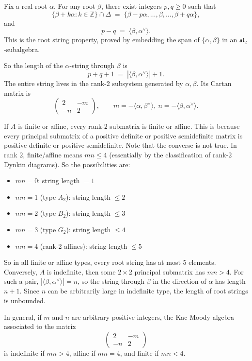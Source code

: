 \documentclass[12pt]{article}
\begin{document}
\begin{solution}
    Fix a real root $\alpha$. For any root $\beta$, there exist integers $p,q\geq 0$ such that
\[
\{\beta+k\alpha : k\in\mathbb Z\}\cap \Delta \;=\; \{\beta-p\alpha, \dots, \beta, \dots, \beta+q\alpha\},
\]
and
\[
p-q \;=\;\langle \beta, \alpha^\vee\rangle.
\]
This is the root string property, proved by embedding the span of $\{\alpha,\beta\}$ in an $\mathfrak{sl}_2$-subalgebra.

So the length of the $\alpha$-string through $\beta$ is
\[
p+q+1 \;=\; |\langle \beta, \alpha^\vee\rangle|+1. 
\]
The entire string lives in the rank-2 subsystem generated by $\alpha,\beta$. Its Cartan matrix is
\[
\begin{pmatrix}
2 & -m \\ -n & 2
\end{pmatrix},\qquad
m=-\langle \alpha,\beta^\vee\rangle,\ n=-\langle \beta,\alpha^\vee\rangle.
\]

If $A$ is finite or affine, every rank-2 submatrix is finite or affine. This is because every principal submatrix of a positive definite or positive semidefinite matrix is positive definite or positive semidefinite. Note that the converse is not true. In rank 2, finite/affine means $mn \leq 4$ (essentially by the classification of rank-2 Dynkin diagrams). So the possibilities are:
\begin{itemize}
    \item $mn=0$: string length $=1$
    \item $mn=1$ (type $A_2$): string length $\leq 2$
    \item $mn=2$ (type $B_2$): string length $\leq 3$
    \item $mn=3$ (type $G_2$): string length $\leq 4$
    \item $mn=4$ (rank-2 affines): string length $\leq 5$
\end{itemize}
So in all finite or affine types, every root string has at most 5 elements. Conversely, $A$ is indefinite, then some $2\times2$ principal submatrix has $mn>4$. For such a pair, $|\langle\beta,\alpha^\vee\rangle|=n$, so the string through $\beta$ in the direction of $\alpha$ has length $n+1$. Since $n$ can be arbitrarily large in indefinite type, the length of root strings is unbounded.
\end{solution}

\begin{remark}
    In general, if $m$ and $n$ are arbitrary positive integers, the Kac-Moody algebra associated to the matrix
    \[\begin{pmatrix}
        2 & -m \\ -n & 2
    \end{pmatrix}\]
    is indefinite if $mn>4$, affine if $mn=4$, and finite if $mn<4$. 
\end{remark}
\end{document}
